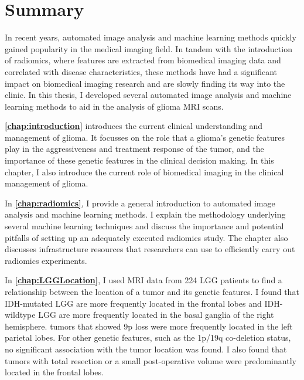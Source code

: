 \chapter{Summary}
\begin{ChapterAbstractNoTitle}
\end{ChapterAbstractNoTitle}

In recent years, automated image analysis and machine learning methods quickly gained popularity in the medical imaging field.
In tandem with the introduction of radiomics, where features are extracted from biomedical imaging data and correlated with disease characteristics, these methods have had a significant impact on biomedical imaging research and are slowly finding its way into the clinic.
In this thesis, I developed several automated image analysis and machine learning methods to aid in the analysis of glioma \gls{MRI} scans.

\textbf{\cref{chap:introduction}} introduces the current clinical understanding and management of glioma.
It focusses on the role that a glioma's genetic features play in the aggressiveness and treatment response of the \gls{tumor}, and the importance of these genetic features in the clinical decision making.
In this chapter, I also introduce the current role of biomedical imaging in the clinical management of glioma.

In \textbf{\cref{chap:radiomics}}, I provide a general introduction to automated image analysis and machine learning methods.
I explain the methodology underlying several machine learning techniques and discuss the importance and potential pitfalls of setting up an adequately executed radiomics study.
The chapter also discusses infrastructure resources that researchers can use to efficiently carry out radiomics experiments.

In \textbf{\cref{chap:LGGLocation}}, I used MRI data from 224 \gls{LGG} patients to find a relationship between the location of a \gls{tumor} and its genetic features.
I found that \gls{IDH}-mutated \gls{LGG} are more frequently located in the frontal lobes and \gls{IDH}-wildtype \gls{LGG} are more frequently located in the basal ganglia of the right hemisphere.
\Glspl{tumor} that showed 9p loss were more frequently located in the left parietal lobes.
For other genetic features, such as the 1p/19q co-deletion status, no significant association with the \gls{tumor} location was found.
I also found that \glspl{tumor} with total resection or a small post-operative volume were predominantly located in the frontal lobes.

